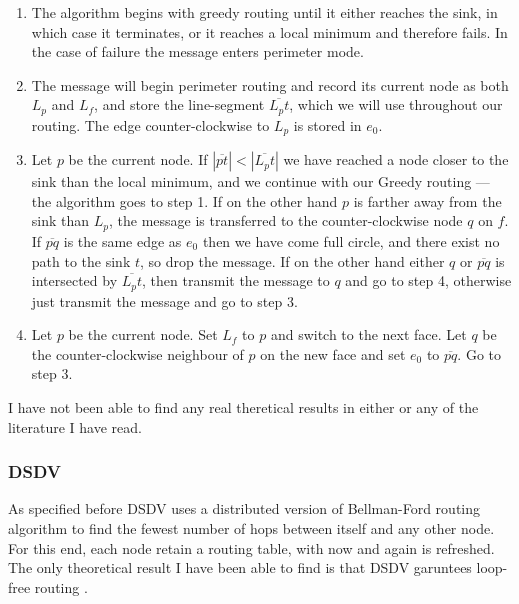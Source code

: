 \begin{enumerate}
\item The algorithm begins with greedy routing until it either reaches the sink, in which case it terminates, or it reaches a local minimum and therefore fails. In the case of failure the message enters perimeter mode.

\item The message will begin perimeter routing and record its current node as both $L_p$ and $L_f$, and store the line-segment $\overline{L_pt}$, which we will use throughout our routing. The edge counter-clockwise to $L_p$ is stored in $e_0$.

\item Let $p$ be the current node. If $|\overline{pt}| < |\overline{L_pt}|$ we have reached a node closer to the sink than the local minimum, and we continue with our Greedy routing --- the algorithm goes to step 1. If on the other hand $p$ is farther away from the sink than $L_p$, the message is transferred to the counter-clockwise node $q$ on $f$. If $\overline{pq}$ is the same edge as $e_0$ then we have come full circle, and there exist no path to the sink $t$, so drop the message. If on the other hand either $q$ or $\overline{pq}$ is intersected by $\overline{L_pt}$, then transmit the message to $q$ and go to step 4, otherwise just transmit the message and go to step 3.

\item Let $p$ be the current node. Set $L_f$ to $p$ and switch to the next face. Let $q$ be the counter-clockwise neighbour of $p$ on the new face and set $e_0$ to $\overline{pq}$. Go to step 3. 
\end{enumerate}

I have not been able to find any real theretical results in either \cite{gpsr} or any of the literature I have read.

\subsubsection{DSDV}

As specified before DSDV uses a distributed version of Bellman-Ford routing algorithm to find the fewest number of hops between itself and any other node. For this end, each node retain a routing table, with now and again is refreshed. The only theoretical result I have been able to find is that DSDV garuntees loop-free routing \cite{DSDV}.

